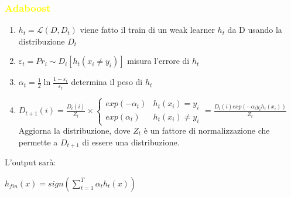 \documentclass[handout
]{beamer}
\def\yellow#1{{\textcolor{yellow}{#1}}}
\begin{document}
\begin{frame}
\frametitle{\yellow{Adaboost}}

\begin{enumerate}

 \item  \begin{math} h_t=\mathcal{L}(D,D_t)\end{math} viene fatto il train di un weak learner  \begin{math} h_t\end{math} da D usando la distribuzione
\begin{math} D_t\end{math}
\item \begin{math} \varepsilon_t=Pr{_i\sim D_i} [h_t(x_i\ne y_i)] \end{math}   misura l'errore di \begin{math} h_t\end{math}
\item \begin{math} \alpha_t=\frac{1}{2}\ln\frac{1-\varepsilon_t}{\varepsilon_t}  \end{math} determina il peso di \begin{math} h_t\end{math}

\item \begin{math} D_{t+1}(i)=\frac{D_t(i)}{Z_t}\times \begin{cases} exp(-\alpha_t) &  h_t(x_i)=y_i \\
                                                         exp(\alpha_t) &  h_t(x_i)\ne y_i
                                                       
                                                      \end{cases} =\frac{D_t(i)exp(-\alpha_ty_ih_t(x_i))}{Z_t} \end{math} 
Aggiorna la distribuzione, dove \begin{math}Z_t \end{math} \`e un fattore di normalizzazione che permette a \begin{math}D_{t+1} \end{math}
di essere una distribuzione.

\end{enumerate}
L'output sar\`a:
\begin{center}
 \begin{math} h_{fin}(x)=sign(\sum_{t=1}^T \alpha_t h_t(x)) \end{math}
\end{center}
\end{frame}
\end{document}
